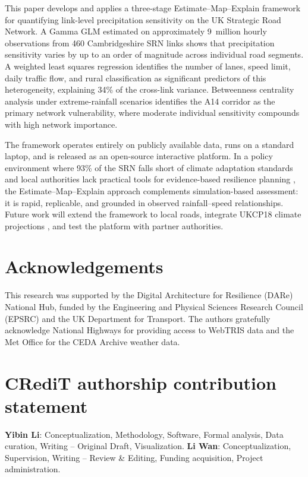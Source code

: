 \documentclass[review]{elsarticle}
\begin{document}
This paper develops and applies a three-stage Estimate--Map--Explain framework for quantifying link-level precipitation sensitivity on the UK Strategic Road Network. A Gamma GLM estimated on approximately 9~million hourly observations from 460 Cambridgeshire SRN links shows that precipitation sensitivity varies by up to an order of magnitude across individual road segments. A weighted least squares regression identifies the number of lanes, speed limit, daily traffic flow, and rural classification as significant predictors of this heterogeneity, explaining 34\% of the cross-link variance. Betweenness centrality analysis under extreme-rainfall scenarios identifies the A14 corridor as the primary network vulnerability, where moderate individual sensitivity compounds with high network importance.

The framework operates entirely on publicly available data, runs on a standard laptop, and is released as an open-source interactive platform. In a policy environment where 93\% of the SRN falls short of climate adaptation standards \citep{nce2026srn} and local authorities lack practical tools for evidence-based resilience planning \citep{dft2024rea}, the Estimate--Map--Explain approach complements simulation-based assessment: it is rapid, replicable, and grounded in observed rainfall--speed relationships. Future work will extend the framework to local roads, integrate UKCP18 climate projections \citep{ukcp18}, and test the platform with partner authorities.


\section*{Acknowledgements}

This research was supported by the Digital Architecture for Resilience (DARe) National Hub, funded by the Engineering and Physical Sciences Research Council (EPSRC) and the UK Department for Transport. The authors gratefully acknowledge National Highways for providing access to WebTRIS data and the Met Office for the CEDA Archive weather data.

\section*{CRediT authorship contribution statement}

\textbf{Yibin Li}: Conceptualization, Methodology, Software, Formal analysis, Data curation, Writing -- Original Draft, Visualization. \textbf{Li Wan}: Conceptualization, Supervision, Writing -- Review \& Editing, Funding acquisition, Project administration.
\end{document}
